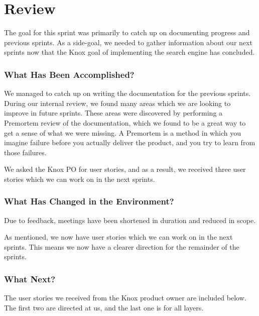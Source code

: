 \section{Review}
The goal for this sprint was primarily to catch up on documenting progress and previous sprints. As a side-goal, we needed to gather information about our next sprints now that the Knox goal of implementing the search engine has concluded.

\subsubsection*{What Has Been Accomplished?}
We managed to catch up on writing the documentation for the previous sprints. During our internal review, we found many areas which we are looking to improve in future sprints. These areas were discovered by performing a Premortem review of the documentation, which we found to be a great way to get a sense of what we were missing. A Premortem is a method in which you imagine failure before you actually deliver the product, and you try to learn from those failures\cite{PremortemSadanForbedrer}.

We asked the Knox PO for user stories, and as a result, we received three user stories which we can work on in the next sprints.

\subsubsection*{What Has Changed in the Environment?}
Due to feedback, meetings have been shortened in duration and reduced in scope. 

As mentioned, we now have user stories which we can work on in the next sprints. This means we now have a clearer direction for the remainder of the sprints.

\subsubsection*{What Next?}
The user stories we received from the Knox product owner are included below. The first two are directed at us, and the last one is for all \knox{} layers.



